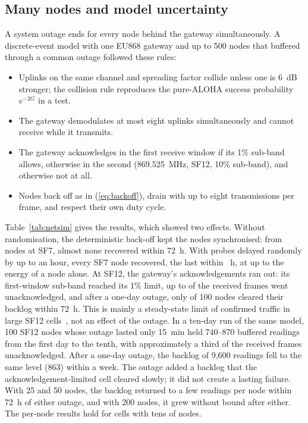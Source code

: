 \subsection{Many nodes and model uncertainty}
\label{sec:hand-network}
A system outage ends for every node behind the gateway simultaneously. A discrete-event model with one EU868 gateway and up to 500 nodes that buffered through a common outage followed these rules:
\begin{itemize}
\item Uplinks on the same channel and spreading factor collide unless one is 6~dB stronger; the collision rule reproduces the pure-ALOHA success probability $e^{-2G}$ in a test.
\item The gateway demodulates at most eight uplinks simultaneously and cannot receive while it transmits.
\item The gateway acknowledges in the first receive window if its 1\% sub-band allows, otherwise in the second (869.525~MHz, SF12, 10\% sub-band), and otherwise not at all.
\item Nodes back off as in (\ref{eq:backoff}), drain with up to eight transmissions per frame, and respect their own duty cycle.
\end{itemize}
Table~\ref{tab:netsim} gives the results, which showed two effects. Without randomisation, the deterministic back-off kept the nodes synchronised: from \netZeroJitterN{} nodes at SF7, almost none recovered within 72~h. With probes delayed randomly by up to an hour, every SF7 node recovered, the last within \netSevenAllMax~h, at up to \netSevenEnergyMax{} the energy of a node alone. At SF12, the gateway's acknowledgements ran out: its first-window sub-band reached its 1\% limit, up to \netTwelveNoAck{} of the received frames went unacknowledged, and after a one-day outage, only \netTwelveCleared{} of 100 nodes cleared their backlog within 72~h. This is mainly a steady-state limit of confirmed traffic in large SF12 cells~\cite{capuzzo2018confirmed,hoang2026unified}, not an effect of the outage. In a ten-day run of the same model, 100 SF12 nodes whose outage lasted only 15~min held 740--870 buffered readings from the first day to the tenth, with approximately a third of the received frames unacknowledged. After a one-day outage, the backlog of 9,600 readings fell to the same level (863) within a week. The outage added a backlog that the acknowledgement-limited cell cleared slowly; it did not create a lasting failure. With 25 and 50 nodes, the backlog returned to a few readings per node within 72~h of either outage, and with 200 nodes, it grew without bound after either. The per-node results hold for cells with tens of nodes.

